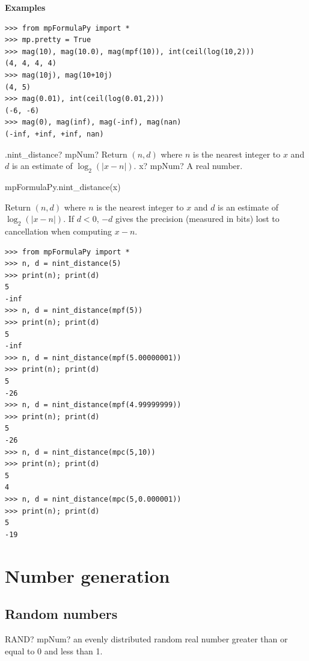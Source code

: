 \vpara
\textbf{Examples}

\begin{lstlisting}
>>> from mpFormulaPy import *
>>> mp.pretty = True
>>> mag(10), mag(10.0), mag(mpf(10)), int(ceil(log(10,2)))
(4, 4, 4, 4)
>>> mag(10j), mag(10+10j)
(4, 5)
>>> mag(0.01), int(ceil(log(0.01,2)))
(-6, -6)
>>> mag(0), mag(inf), mag(-inf), mag(nan)
(-inf, +inf, +inf, nan)
\end{lstlisting}


\vspace{0.6cm}

\begin{mpFunctionsExtract}
	\mpFunctionOne
	{.nint\_distance? mpNum? Return $(n,d)$ where $n$ is the nearest integer to $x$ and $d$ is an estimate of $\log_2(|x-n|)$.}
	{x? mpNum? A real number.}
\end{mpFunctionsExtract}


mpFormulaPy.nint\_distance(x)

\vpara
Return $(n,d)$ where $n$ is the nearest integer to $x$ and $d$ is an estimate of $\log_2(|x-n|)$. If $d<0$, $-d$ gives the precision (measured in bits) lost to cancellation when computing $x-n$.

\begin{lstlisting}
>>> from mpFormulaPy import *
>>> n, d = nint_distance(5)
>>> print(n); print(d)
5
-inf
>>> n, d = nint_distance(mpf(5))
>>> print(n); print(d)
5
-inf
>>> n, d = nint_distance(mpf(5.00000001))
>>> print(n); print(d)
5
-26
>>> n, d = nint_distance(mpf(4.99999999))
>>> print(n); print(d)
5
-26
>>> n, d = nint_distance(mpc(5,10))
>>> print(n); print(d)
5
4
>>> n, d = nint_distance(mpc(5,0.000001))
>>> print(n); print(d)
5
-19
\end{lstlisting}


\newpage
\section{Number generation}


\subsection{Random numbers}
\label{RandomNumberInterface}



\begin{mpFunctionsExtract}
	\mpWorksheetFunctionZero
	{RAND? mpNum? an evenly distributed random real number greater than or equal to 0 and less than 1.}
\end{mpFunctionsExtract}


